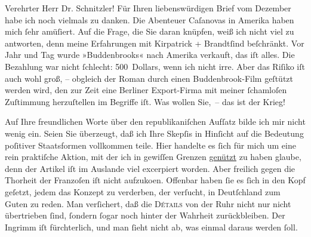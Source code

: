 \pstart{}Verehrter Herr Dr. Schnitzler!\pend\vspace{0.5em}
\pstart
           Für Ihren liebenswürdigen Brief vom Dezember habe ich noch vielmals zu
               danken. Die Abenteuer Caſanovas in Amerika haben mich ſehr amüſiert. Auf
               die Frage, die Sie daran knüpfen, weiß ich nicht viel zu antworten, denn meine
               Erfahrungen mit Kirpatrick + Brandtſind beſchränkt. Vor Jahr und Tag wurde »Buddenbrooks« nach Amerika verkauft, das iſt alles. Die Bezahlung war nicht ſchlecht:
               500 Dollars, wenn ich nicht irre. Aber das Riſiko iſt auch wohl groß, – obgleich der
               Roman durch einen Buddenbrook-Film geſtützt
               werden wird, den zur Zeit eine Berliner
               Export-Firma mit meiner ſchamloſen Zuſtimmung {\pb}herzuſtellen im Begriffe iſt. Was wollen
               Sie, – das ist der Krieg!\pend
           
\pstart
           Auf Ihre freundlichen Worte über den republikaniſchen Aufſatz bilde ich mir nicht wenig ein. Seien Sie überzeugt,
               daß ich Ihre Skepſis in Hinſicht auf die Bedeutung poſitiver Staatsformen vollkommen
               teile. Hier handelte es ſich für mich um eine rein praktiſche Aktion, mit der ich in
               gewiſſen Grenzen \uline{genützt} zu haben glaube, denn der
                  Artikel iſt im Auslande
               viel excerpiert worden. Aber freilich gegen die Thorheit der Franzoſen iſt nicht aufzuko{\geminationm}en.
               Offenbar haben ſie es ſich in den Kopf geſetzt, jedem das Konzept zu verderben, der
               verſucht, in Deutſchland zum Guten zu reden. Man
               verſichert, daß die \textsc{Détails} von der Ruhr nicht nur nicht übertrieben ſind, ſon{\pb}dern ſogar noch hinter der Wahrheit
               zurückbleiben. Der Ingrimm iſt fürchterlich, und man ſieht nicht ab, was einmal
               daraus werden ſoll.\pend
           
